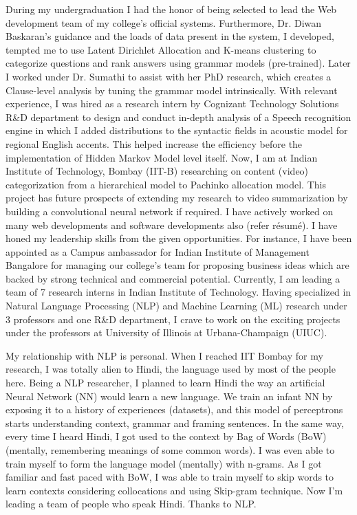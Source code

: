\documentclass[letterpaper]{article}
\begin{document}
During my undergraduation I had the honor of being selected to lead the Web development team of my college’s official systems. Furthermore, Dr. Diwan Baskaran’s guidance and the loads of data present in the system, I developed, tempted me to use Latent Dirichlet Allocation and K-means clustering to categorize questions and rank answers using grammar models (pre-trained). Later I worked under Dr. Sumathi to assist with her PhD research, which creates a Clause-level analysis by tuning the grammar model intrinsically. With relevant experience, I was hired as a research intern by Cognizant Technology Solutions R\&D department to design and conduct in-depth analysis of a Speech recognition engine in which I added distributions to the syntactic fields in acoustic model for regional English accents. This helped increase the efficiency before the implementation of Hidden Markov Model level itself. Now, I am at Indian Institute of Technology, Bombay (IIT-B) researching on content (video) categorization from a hierarchical model to Pachinko allocation model. This project has future prospects of extending my research to video summarization by building a convolutional neural network if required. I have actively worked on many web developments and software developments also (refer résumé). I have honed my leadership skills from the given opportunities. For instance, I have been appointed as a Campus ambassador for Indian Institute of Management Bangalore for managing our college’s team for proposing business ideas which are backed by strong technical and commercial potential. Currently, I am leading a team of 7 research interns in Indian Institute of Technology.  Having specialized in Natural Language Processing (NLP) and Machine Learning (ML) research  under 3 professors and one R\&D department, I crave to work on the exciting projects under the professors at University of Illinois at Urbana-Champaign (UIUC).\\ \par


My relationship with NLP is personal. When I reached IIT Bombay for my research, I was totally alien to Hindi, the language used by most of the people here. Being a NLP researcher, I planned to learn Hindi the way an artificial Neural Network (NN) would learn a new language. We train an infant NN by exposing it to a history of experiences (datasets), and this model of perceptrons starts understanding context, grammar and framing sentences. In the same way, every time I heard Hindi, I got used to the context by Bag of Words (BoW) (mentally, remembering meanings of some common words). I was even able to train myself to form the language model (mentally) with n-grams. As I got familiar and fast paced with BoW, I was able to train myself to skip words to learn contexts considering collocations and using Skip-gram technique. Now I'm leading a team of people who speak Hindi. Thanks to NLP. \\ \par
\end{document}
